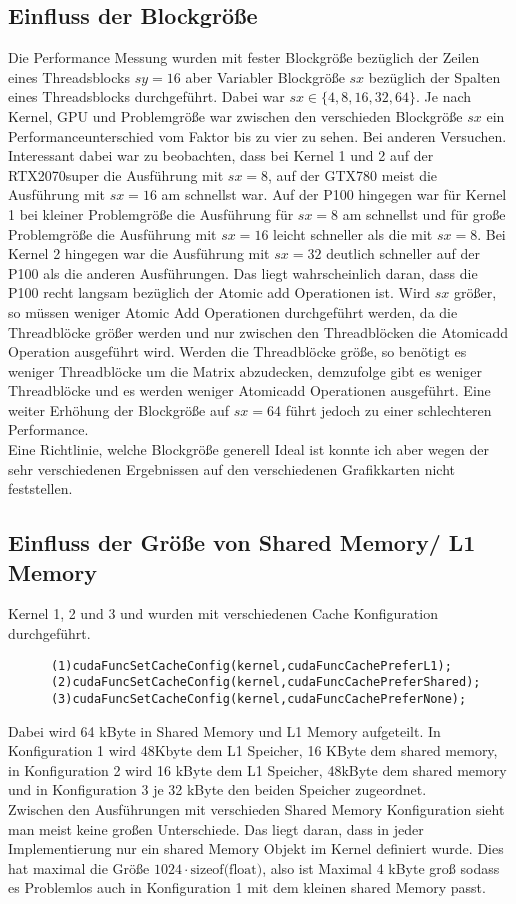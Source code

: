 \documentclass[10pt,a4paper]{article}
\begin{document}
	  \subsection{Einfluss der Blockgröße}
	  Die Performance Messung wurden mit fester Blockgröße bezüglich der Zeilen eines Threadsblocks $sy=16$ aber Variabler Blockgröße $sx$ bezüglich der Spalten eines Threadsblocks durchgeführt. Dabei war $sx\in\{4,8,16,32,64\}$. Je nach Kernel, GPU und Problemgröße war zwischen den verschieden Blockgröße $sx$ ein Performanceunterschied vom Faktor bis zu vier zu sehen. Bei anderen Versuchen. Interessant dabei war zu beobachten, dass bei Kernel 1 und 2 auf der RTX2070super die Ausführung mit $sx=8$, auf der GTX780 meist die Ausführung mit $sx=16$ am schnellst war. Auf der P100 hingegen war für Kernel 1 bei kleiner Problemgröße die Ausführung für $sx=8$ am schnellst und für große Problemgröße die Ausführung mit $sx=16$ leicht schneller als die mit $sx=8$. Bei Kernel 2 hingegen war die Ausführung mit $sx=32$ deutlich schneller auf der P100 als die anderen Ausführungen. Das liegt wahrscheinlich daran, dass die P100 recht langsam bezüglich der Atomic add Operationen ist. Wird $sx$ größer, so müssen weniger Atomic Add Operationen durchgeführt werden, da die Threadblöcke größer werden und nur zwischen den Threadblöcken die Atomicadd Operation ausgeführt wird. Werden die Threadblöcke größe, so benötigt es weniger Threadblöcke um die Matrix abzudecken, demzufolge gibt es weniger Threadblöcke und es werden weniger Atomicadd Operationen ausgeführt. Eine weiter Erhöhung der Blockgröße auf $sx=64$ führt jedoch zu einer schlechteren Performance. \\
	  Eine Richtlinie, welche Blockgröße generell Ideal ist konnte ich aber wegen der sehr verschiedenen Ergebnissen auf den verschiedenen Grafikkarten nicht feststellen.
	 
	  \subsection{Einfluss der Größe von Shared Memory/ L1 Memory}
	  Kernel 1, 2 und 3 und wurden mit verschiedenen Cache Konfiguration durchgeführt.
	  \begin{lstlisting}
	  (1)cudaFuncSetCacheConfig(kernel,cudaFuncCachePreferL1);
	  (2)cudaFuncSetCacheConfig(kernel,cudaFuncCachePreferShared);
	  (3)cudaFuncSetCacheConfig(kernel,cudaFuncCachePreferNone);  
	  \end{lstlisting}
		Dabei wird 64 kByte in Shared Memory und L1 Memory aufgeteilt. In Konfiguration 1 wird 48Kbyte dem L1 Speicher, 16 KByte dem shared memory, in Konfiguration 2 wird 16 kByte dem L1 Speicher, 48kByte dem shared memory und in Konfiguration 3 je 32 kByte den beiden Speicher zugeordnet. 
		\\ Zwischen den Ausführungen mit verschieden Shared Memory Konfiguration sieht man meist keine großen Unterschiede. Das liegt daran, dass in jeder Implementierung nur ein shared Memory Objekt im Kernel definiert wurde. Dies hat maximal die Größe $1024\cdot \text {sizeof(float)}$, also ist Maximal 4 kByte groß sodass es Problemlos auch in Konfiguration 1 mit dem kleinen shared Memory passt.
\end{document}
